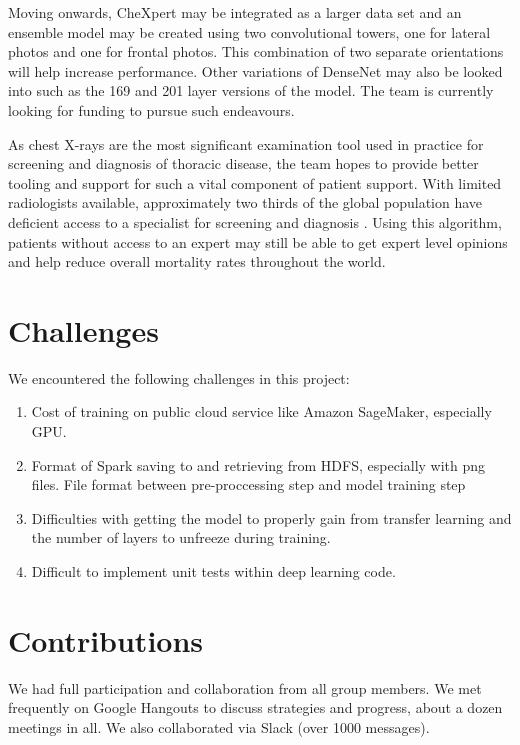 \documentclass{amia}
\begin{document}
Moving onwards, CheXpert may be integrated as a larger data set and an ensemble model may be created using two convolutional towers, one for lateral photos and one for frontal photos. This combination of two separate orientations will help increase performance. Other variations of DenseNet may also be looked into such as the 169 and 201 layer versions of the model. The team is currently looking for funding to pursue such endeavours.

As chest X-rays are the most significant examination tool used in practice for screening and diagnosis of thoracic disease, the team hopes to provide better tooling and support for such a vital component of patient support. With limited radiologists available, approximately two thirds of the global population have deficient access to a specialist for screening and diagnosis \cite{ref16}. Using this algorithm, patients without access to an expert may still be able to get expert level opinions and help reduce overall mortality rates throughout the world.

\pagebreak

\section*{Challenges}

We encountered the following challenges in this project:
\begin{enumerate}
    \item Cost of training on public cloud service like Amazon SageMaker, especially GPU.
    \item Format of Spark saving to and retrieving from HDFS, especially with png files.
    \itemTransferring File format between pre-proccessing step and model training step
    \item  Difficulties with getting the model to properly gain from transfer learning and the number of layers to unfreeze during training.
    \item  Difficult to implement unit tests within deep learning code.
\end{enumerate}

\section*{Contributions}
We had full participation and collaboration from all group members. We met frequently on Google Hangouts to discuss strategies and progress, about a dozen meetings in all. We also collaborated via Slack (over 1000 messages).
\end{document}
